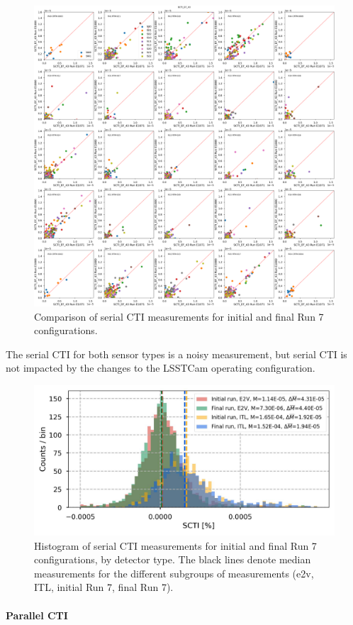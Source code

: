 \begin{figure}[ht]
    \centering
    \includegraphics[width=0.7\linewidth]{figures/finalCharacterization/E1071_E1880_SCTI_EF_43_inset.png}
    \caption{Comparison of serial CTI measurements for initial and final Run 7 configurations.}
    \label{fig:finalChar-SCTI-5x5}
\end{figure}

The serial CTI for both sensor types is a noisy measurement, but serial CTI is not impacted by the changes to the LSSTCam operating configuration.

\begin{figure}[ht]
    \centering
    \includegraphics[width=0.7\linewidth]{figures/finalCharacterization/SCTIComp(6).jpg}
    \caption{Histogram of serial CTI measurements for initial and final Run 7 configurations, by detector type. The black lines denote median measurements for the different subgroups of measurements (e2v, ITL, initial Run 7, final Run 7).}
    \label{fig:finalChar-SCTI-hist}
\end{figure}

\clearpage


\paragraph{Parallel CTI}\label{sec:finalChar-parallel-cti}

